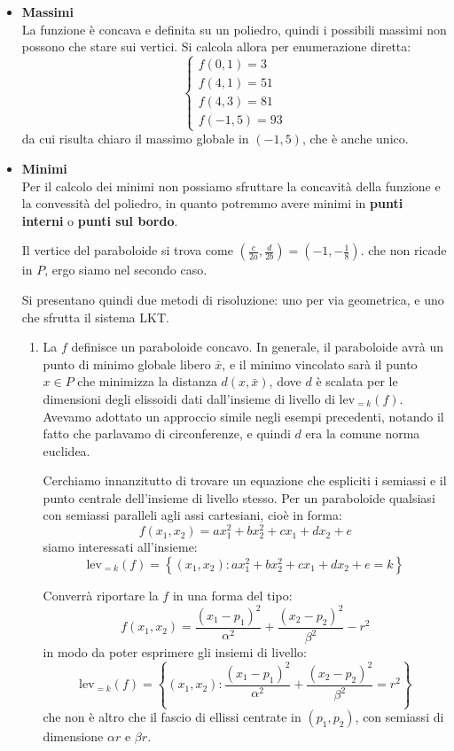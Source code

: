 \documentclass[a4paper,11pt]{article}
\begin{document}
\begin{itemize}
	\item \textbf{\textsf{Massimi}} \\
		La funzione è concava e definita su un poliedro, quindi i possibili massimi non possono che stare sui vertici.
		Si calcola allora per enumerazione diretta:
		\[
			\begin{cases}		
				f(0,1) = 3 \\ 
				f(4,1) = 51 \\ 
				f(4,3) = 81 \\
				f(-1, 5) = 93
			\end{cases}
		\]
		da cui risulta chiaro il massimo globale in $(-1, 5)$, che è anche unico.
	\item \textbf{\textsf{Minimi}} \\
		Per il calcolo dei minimi non possiamo sfruttare la concavità della funzione e la convessità del poliedro, in quanto potremmo avere minimi in \textbf{punti interni} o \textbf{punti sul bordo}.

		Il vertice del paraboloide si trova come $\left(\frac{c}{2a}, \frac{d}{2b}\right) = \left( -1, -\frac{1}{8} \right)$. che non ricade in $P$, ergo siamo nel secondo caso.

		Si presentano quindi due metodi di risoluzione: uno per via geometrica, e uno che sfrutta il sistema LKT.
		\begin{enumerate}
			\item La $f$ definisce un paraboloide concavo.
				In generale, il paraboloide avrà un punto di minimo globale libero $\bar{x}$, e il minimo vincolato sarà il punto $x \in P$ che minimizza la distanza $d(x, \bar{x})$, dove $d$ è scalata per le dimensioni degli elissoidi dati dall'insieme di livello di $\mathrm{lev}_{=k}(f)$.
				Avevamo adottato un approccio simile negli esempi precedenti, notando il fatto che parlavamo di circonferenze, e quindi $d$ era la comune norma euclidea.
			
				Cerchiamo innanzitutto di trovare un equazione che espliciti i semiassi e il punto centrale dell'insieme di livello stesso.
				Per un paraboloide qualsiasi con semiassi paralleli agli assi cartesiani, cioè in forma:
				$$
				f(x_1, x_2) = ax_1^2 + bx_2^2 + cx_1 + dx_2 + e
				$$
				siamo interessati all'insieme:
				$$
				\mathrm{lev}_{=k} (f) = \left\{ (x_1, x_2) : ax_1^2 + bx_2^2 + cx_1 + dx_2 + e = k \right\}
				$$
				
				Converrà riportare la $f$ in una forma del tipo:
				$$
				f(x_1, x_2) = \frac{(x_1 - p_1)^2}{\alpha^2} + \frac{(x_2 - p_2)^2}{\beta^2} - r^2
				$$
				in modo da poter esprimere gli insiemi di livello:
				$$
				\mathrm{lev}_{=k} (f) = \left\{ (x_1, x_2) :  \frac{(x_1 - p_1)^2}{\alpha^2} + \frac{(x_2 - p_2)^2}{\beta^2} = r^2 \right\}
				$$
				che non è altro che il fascio di ellissi centrate in $(p_1, p_2)$, con semiassi di dimensione $\alpha r$ e $\beta r$.


\end{enumerate}
\end{itemize}
\end{document}
